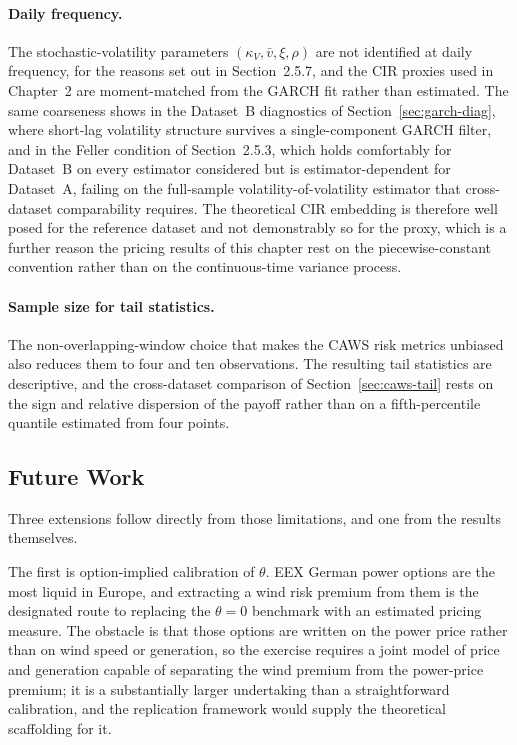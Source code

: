 \documentclass[11pt, a4paper, twoside]{article}
\begin{document}
\paragraph{Daily frequency.} The stochastic-volatility parameters $(\kappa_V, \bar v, \xi, \rho)$ are not identified at daily frequency, for the reasons set out in Section~2.5.7, and the CIR proxies used in Chapter~2 are moment-matched from the GARCH fit rather than estimated. The same coarseness shows in the Dataset~B diagnostics of Section~\ref{sec:garch-diag}, where short-lag volatility structure survives a single-component GARCH filter, and in the Feller condition of Section~2.5.3, which holds comfortably for Dataset~B on every estimator considered but is estimator-dependent for Dataset~A, failing on the full-sample volatility-of-volatility estimator that cross-dataset comparability requires. The theoretical CIR embedding is therefore well posed for the reference dataset and not demonstrably so for the proxy, which is a further reason the pricing results of this chapter rest on the piecewise-constant convention rather than on the continuous-time variance process.

\paragraph{Sample size for tail statistics.} The non-overlapping-window choice that makes the CAWS risk metrics unbiased also reduces them to four and ten observations. The resulting tail statistics are descriptive, and the cross-dataset comparison of Section~\ref{sec:caws-tail} rests on the sign and relative dispersion of the payoff rather than on a fifth-percentile quantile estimated from four points.

\subsection{Future Work}
\label{sec:concl-future}

Three extensions follow directly from those limitations, and one from the results themselves.

The first is option-implied calibration of $\theta$. EEX German power options are the most liquid in Europe, and extracting a wind risk premium from them is the designated route to replacing the $\theta = 0$ benchmark with an estimated pricing measure. The obstacle is that those options are written on the power price rather than on wind speed or generation, so the exercise requires a joint model of price and generation capable of separating the wind premium from the power-price premium; it is a substantially larger undertaking than a straightforward calibration, and the \citet{CarrLee2009} replication framework would supply the theoretical scaffolding for it.
\end{document}
